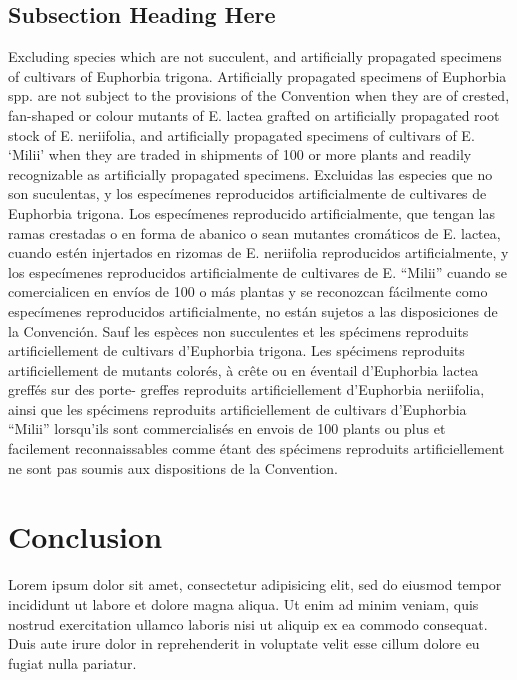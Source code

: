 \subsection{Subsection Heading Here}

Excluding species which are not succulent, and artificially
propagated specimens of cultivars of Euphorbia trigona.
Artificially propagated specimens of Euphorbia spp. are not
subject to the provisions of the Convention when they are of
crested, fan-shaped or colour mutants of E. lactea grafted on
artificially propagated root stock of E. neriifolia, and artificially
propagated specimens of cultivars of E. ‘Milii’ when they are
traded in shipments of 100 or more plants and readily
recognizable as artificially propagated specimens.
Excluidas las especies que no son suculentas, y los
especímenes reproducidos artificialmente de cultivares de
Euphorbia trigona. Los especímenes reproducido
artificialmente, que tengan las ramas crestadas o en forma de
abanico o sean mutantes cromáticos de E. lactea, cuando
estén injertados en rizomas de E. neriifolia reproducidos
artificialmente, y los especímenes reproducidos artificialmente
de cultivares de E. “Milii” cuando se comercialicen en envíos
de 100 o más plantas y se reconozcan fácilmente como
especímenes reproducidos artificialmente, no están sujetos a
las disposiciones de la Convención.
Sauf les espèces non succulentes et les spécimens reproduits
artificiellement de cultivars d'Euphorbia trigona. Les
spécimens reproduits artificiellement de mutants colorés, à
crête ou en éventail d’Euphorbia lactea greffés sur des porte-
greffes reproduits artificiellement d'Euphorbia neriifolia, ainsi
que les spécimens reproduits artificiellement de cultivars
d’Euphorbia “Milii” lorsqu’ils sont commercialisés en envois de
100 plants ou plus et facilement reconnaissables comme étant
des spécimens reproduits artificiellement ne sont pas soumis
aux dispositions de la Convention.



\section{Conclusion}

Lorem ipsum dolor sit amet, consectetur adipisicing elit, sed do eiusmod tempor
incididunt ut labore et dolore magna aliqua. Ut enim ad minim veniam, quis
nostrud exercitation ullamco laboris nisi ut aliquip ex ea commodo consequat.
Duis aute irure dolor in reprehenderit in voluptate velit esse cillum dolore eu
fugiat nulla pariatur.